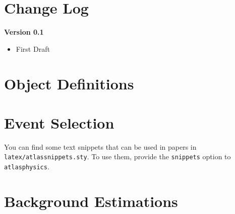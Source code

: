 \documentclass[NOTE, atlasdraft=true, texlive=2016, UKenglish]{\ATLASLATEXPATH atlasdoc}
\begin{document}
\maketitle

\tableofcontents



\newpage
\section{Change Log}
\label{sec:change}
\textbf{Version 0.1}
\begin{itemize}
\item First Draft
\end{itemize}



\newpage
\section{Object Definitions}
\label{sec:objdef}


\newpage
\section{Event Selection}
\label{sec:evsel}

You can find some text snippets that can be used in papers in \texttt{latex/atlassnippets.sty}.
To use them, provide the \texttt{snippets} option to \texttt{atlasphysics}.


\newpage
\section{Background Estimations}
\label{sec:bkg}
\end{document}
